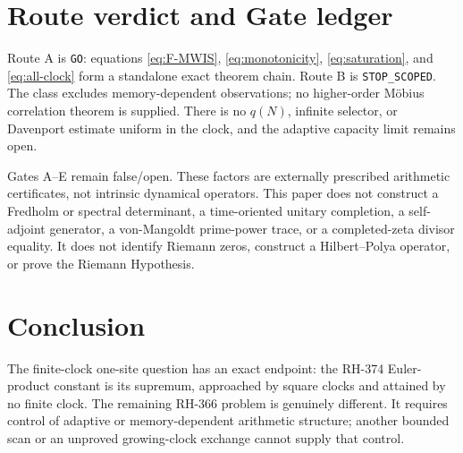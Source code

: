 \documentclass[11pt]{article}
\theoremstyle{definition}
\theoremstyle{remark}
\begin{document}
\section{Route verdict and Gate ledger}

Route A is \texttt{GO}: equations \eqref{eq:F-MWIS},
\eqref{eq:monotonicity}, \eqref{eq:saturation}, and \eqref{eq:all-clock}
form a standalone exact theorem chain.  Route B is
\texttt{STOP\_SCOPED}.  The class excludes memory-dependent observations;
no higher-order M\"obius correlation theorem is supplied.  There is no
$q(N)$, infinite selector, or Davenport estimate uniform in the clock, and
the adaptive capacity limit remains open.

Gates A--E remain false/open.  These factors are externally prescribed
arithmetic certificates, not intrinsic dynamical operators.  This paper does
not construct a Fredholm or spectral determinant, a time-oriented unitary
completion, a self-adjoint generator, a von-Mangoldt prime-power trace, or a
completed-zeta divisor equality.  It does not identify Riemann zeros,
construct a Hilbert--Polya operator, or prove the Riemann Hypothesis.

\section{Conclusion}

The finite-clock one-site question has an exact endpoint: the RH-374
Euler-product constant is its supremum, approached by square clocks and
attained by no finite clock.  The remaining RH-366 problem is genuinely
different.  It requires control of adaptive or memory-dependent arithmetic
structure; another bounded scan or an unproved growing-clock exchange cannot
supply that control.



\end{document}
